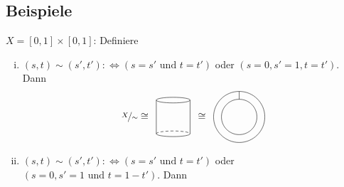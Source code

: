 \subsection[Beispiele zur Quotiententopologie]{Beispiele}
\label{sub:210}
$X = [0,1] \times [0,1]$: Definiere 
\begin{enumerate}[(i)]
	\item $(s,t) \sim (s', t') :\Leftrightarrow (s=s' \text{ und } t=t')$ oder $(s=0, s'=1, t=t')$. Dann 
	\[
		\nicefrac{X}{\sim} \cong \enspace
		\vcenter{\hbox{\begin{tikzpicture}[yscale=0.2,xscale=0.3]
		\draw (-2,6) -- (-2,0) arc (180:360:2cm and 0.5cm) -- (2,6) ++ (-2,0) circle (2cm and 0.5cm);
		\draw[densely dashed] (-2,0) arc (180:0:2cm and 0.5cm);
		\end{tikzpicture}}} \enspace
		 \cong \enspace \vcenter{\hbox{\begin{tikzpicture}[scale=0.7]
		 	\draw (0,0) circle[radius=0.9];
			\draw (0,0) circle[radius=1.3];
			\draw (0,0.9) -- (0,1.3);
		 \end{tikzpicture}}}
	\]
	\item $(s,t) \sim (s',t') :\Leftrightarrow (s=s' \text{ und }t=t')$ oder $(s=0, s'=1 \text{ und } t=1-t')$. Dann \\
	\begin{minipage}{\textwidth}
		\captionsetup{type=figure, skip=0pt}
\end{minipage}
\end{enumerate}

